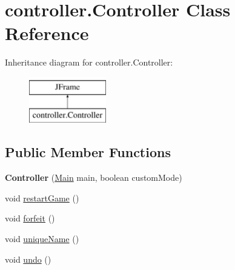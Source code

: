 \hypertarget{classcontroller_1_1_controller}{}\section{controller.\+Controller Class Reference}
\label{classcontroller_1_1_controller}
Inheritance diagram for controller.\+Controller\+:\begin{figure}[H]
\begin{center}
\leavevmode
\includegraphics[height=2.000000cm]{classcontroller_1_1_controller}
\end{center}
\end{figure}
\subsection*{Public Member Functions}
\begin{DoxyCompactItemize}
\item 
\mbox{\label{classcontroller_1_1_controller_adec12cce695b249689e63a10d307e2fe}} 
{\bfseries Controller} (\mbox{\hyperlink{class_g_u_i_1_1_main}{Main}} main, boolean custom\+Mode)
\item 
void \mbox{\hyperlink{classcontroller_1_1_controller_aef977092ec31c33e0f76ced1d3b55647}{restart\+Game}} ()
\item 
void \mbox{\hyperlink{classcontroller_1_1_controller_ab82a41df79bac7338424998579c31729}{forfeit}} ()
\item 
void \mbox{\hyperlink{classcontroller_1_1_controller_a4e937aa816be2e00cc7ae10836c6aa13}{unique\+Name}} ()
\item 
void \mbox{\hyperlink{classcontroller_1_1_controller_a887f5b6788ff3f0001cf02d7ba5e6b27}{undo}} ()
\end{DoxyCompactItemize}
